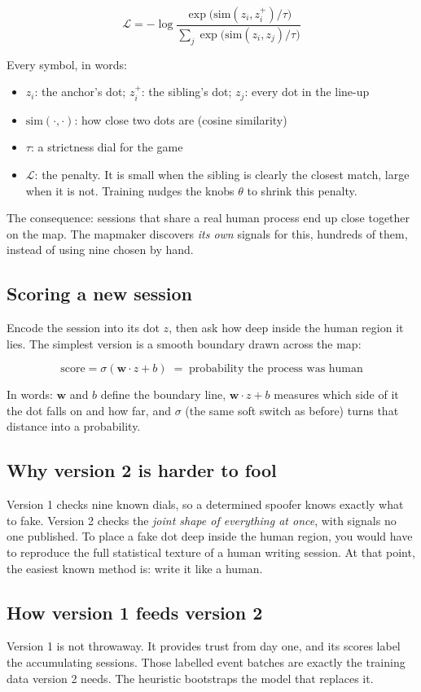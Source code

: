 \documentclass[11pt,a4paper]{article}
\begin{document}
\[
\mathcal{L} = -\log \frac{\exp\!\big(\mathrm{sim}(z_i, z_i^{+}) / \tau\big)}{\sum_{j} \exp\!\big(\mathrm{sim}(z_i, z_j) / \tau\big)}
\]

Every symbol, in words:
\begin{itemize}
  \item $z_i$: the anchor's dot; $z_i^{+}$: the sibling's dot; $z_j$: every dot in the line-up
  \item $\mathrm{sim}(\cdot,\cdot)$: how close two dots are (cosine similarity)
  \item $\tau$: a strictness dial for the game
  \item $\mathcal{L}$: the penalty. It is small when the sibling is clearly the closest match, large when it is not. Training nudges the knobs $\theta$ to shrink this penalty.
\end{itemize}

The consequence: sessions that share a real human process end up close together on the map. The mapmaker discovers \emph{its own} signals for this, hundreds of them, instead of using nine chosen by hand.

\subsection*{Scoring a new session}

Encode the session into its dot $z$, then ask how deep inside the human region it lies. The simplest version is a smooth boundary drawn across the map:

\[
\text{score} = \sigma(\mathbf{w} \cdot z + b) \;=\; \text{probability the process was human}
\]

In words: $\mathbf{w}$ and $b$ define the boundary line, $\mathbf{w} \cdot z + b$ measures which side of it the dot falls on and how far, and $\sigma$ (the same soft switch as before) turns that distance into a probability.

\subsection*{Why version 2 is harder to fool}

Version 1 checks nine known dials, so a determined spoofer knows exactly what to fake. Version 2 checks the \emph{joint shape of everything at once}, with signals no one published. To place a fake dot deep inside the human region, you would have to reproduce the full statistical texture of a human writing session. At that point, the easiest known method is: write it like a human.

\subsection*{How version 1 feeds version 2}

Version 1 is not throwaway. It provides trust from day one, and its scores label the accumulating sessions. Those labelled event batches are exactly the training data version 2 needs. The heuristic bootstraps the model that replaces it.
\end{document}
